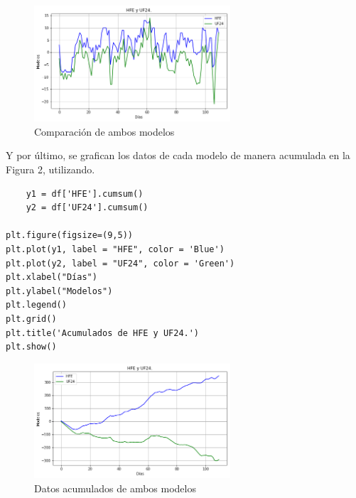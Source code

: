 \documentclass[11pt, spanish]{report}
\begin{document}
\begin{figure}[ht]
\caption{Comparación de ambos modelos}
\centering
\includegraphics[width=0.65\textwidth]{HFEyUF24.png}
\end{figure}
Y por último, se grafican los datos de cada modelo de manera acumulada en la Figura 2, utilizando.
\begin{verbatim}
    y1 = df['HFE'].cumsum()
    y2 = df['UF24'].cumsum()

plt.figure(figsize=(9,5))
plt.plot(y1, label = "HFE", color = 'Blue')   
plt.plot(y2, label = "UF24", color = 'Green')   
plt.xlabel("Días")   
plt.ylabel("Modelos")  
plt.legend()
plt.grid()
plt.title('Acumulados de HFE y UF24.')
plt.show()
\end{verbatim}
\begin{figure}[ht]
\caption{Datos acumulados de ambos modelos}
\centering
\includegraphics[width=0.65\textwidth]{acum.png}
\end{figure}
\end{document}
